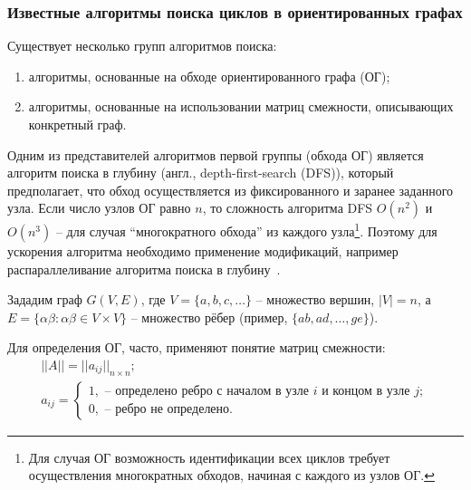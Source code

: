 \def\notedate{2021.11.14}
\def\currentauthor{Муха В. (РК6-73Б)}

\subsubsection{Известные алгоритмы поиска циклов в ориентированных графах}

Существует несколько групп алгоритмов поиска\cite{davidrajuh2016}:
\begin{enumerate}[label=\arabic*)]
    \item алгоритмы, основанные на обходе ориентированного графа (ОГ);
    \item алгоритмы, основанные на использовании матриц смежности, описывающих конкретный граф.
\end{enumerate}

Одним из представителей алгоритмов первой группы (обхода ОГ) является алгоритм поиска в глубину (англ., depth-first-search (DFS)), который предполагает, что обход осуществляется из фиксированного и заранее заданного узла. Если число узлов ОГ равно $n$, то сложность алгоритма DFS $O(n^2)$ и $O(n^3)$ -- для случая ``многократного обхода'' из каждого узла\footnote{Для случая ОГ возможность идентификации всех циклов требует осуществления многократных обходов, начиная с каждого из узлов ОГ.}. Поэтому для ускорения алгоритма необходимо применение модификаций, например распараллеливание алгоритма поиска в глубину~\cite{Mahdi2011}.

Зададим граф $G(V, E)$, где $V = \{a, b, c, \ldots\}$ -- множество вершин, $|V|=n$, а $E = \{\alpha\beta: \alpha\beta\in V\times V\}$ -- множество рёбер (пример, $\{ab, ad, \ldots , ge\}$).

Для определения ОГ, часто, применяют понятие матриц смежности\cite{UUU}:
\begin{equation}\label{eq.rndhpcedt.2021.11.14.01}
\begin{array}{l}
||A||=||a_{ij}||_{n\times n};\\
a_{ij}=\left\{\begin{array}{l} 1, \mbox{ -- определено ребро с началом в узле $i$ и концом в узле $j$};\\ 0, \mbox{ -- ребро не определено}.\end{array} \right.
\end{array}
\end{equation}

